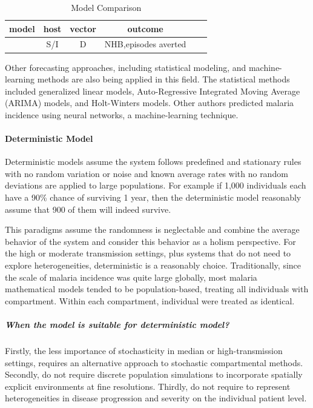 \documentclass[a4paper, 12pt, twoside]{article}
\begin{document}
\begin{table}[htpb]
  \centering
  \caption{Model Comparison}
  \label{tab:model_comparison}
  \begin{tabular}{cccccc}
  \toprule
  model & host & vector & outcome &  & \\
  \midrule
  \cite{Briet2013} & S/I & D & NHB,episodes averted & & \\
  \bottomrule
  \end{tabular}
\end{table}
Other forecasting approaches, including statistical modeling, and machine-learning methods are also being applied in this field.
The statistical methods included generalized linear models, Auto-Regressive Integrated Moving Average (ARIMA) models\cite{box2015time,Anokye2018}, and Holt-Winters models\cite{Chatfield1978}.
Other authors\cite{Toh2021a,Libbrecht2015,Nkiruka2021,Verma2020,Kim2019,Khameneh2014,Ebhuoma2018,Hancock2020} predicted malaria incidence using neural networks, a machine-learning technique.

\paragraph{Deterministic Model}%
\label{par:deterministic_model}

Deterministic models assume the system follows predefined and stationary rules with no random variation or noise and known average rates with no random deviations are applied to large populations.
For example if 1,000 individuals each have a 90\% chance of surviving 1 year, then the deterministic model reasonably assume that 900 of them will indeed survive.

This paradigms assume the randomness is neglectable and combine the average behavior of the system and consider this behavior as a holism perspective.
For the high or moderate transmission settings, plus systems that do not need to explore heterogeneities, deterministic is a reasonably choice.
Traditionally, since the scale of malaria incidence was quite large globally, most malaria mathematical models tended to be population-based, treating all individuals with compartment.
Within each compartment, individual were treated as identical.

\subparagraph{When the model is suitable for deterministic model?}%
\label{par:when_the_model_is_suitable_for_deterministic_model_}
Firstly, the less importance of stochasticity in median or high-transmission settings, requires an alternative approach to stochastic compartmental methods.
Secondly, do not require discrete population simulations to incorporate spatially explicit environments at fine resolutions.
Thirdly, do not require to represent heterogeneities in disease progression and severity on the individual patient level.
\end{document}
